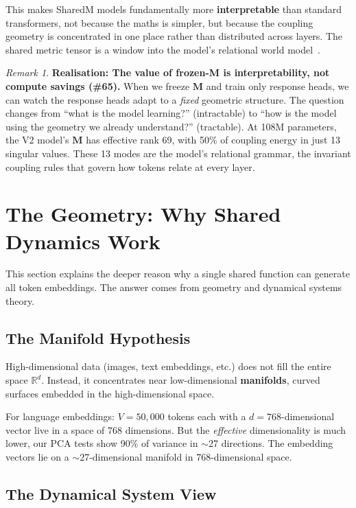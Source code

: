 \documentclass[11pt, a4paper]{article}
\newcommand{\M}{\mathbf{M}}
\newcommand{\R}{\mathbb{R}}
\theoremstyle{remark}
\newtheorem*{remark}{Remark}
\begin{document}
This makes SharedM models fundamentally more \textbf{interpretable} than standard transformers, not because the maths is simpler, but because the coupling geometry is concentrated in one place rather than distributed across layers.
The shared metric tensor is a window into the model's relational world model~\cite{brunton2022data}.

\begin{remark}
\textbf{Realisation: The value of frozen-M is interpretability, not compute savings (\#65).}
When we freeze $\M$ and train only response heads, we can watch the response heads adapt to a \emph{fixed} geometric structure.
The question changes from ``what is the model learning?'' (intractable) to ``how is the model using the geometry we already understand?'' (tractable).
At 108M parameters, the V2 model's $\M$ has effective rank 69, with 50\% of coupling energy in just 13 singular values.
These 13 modes are the model's relational grammar, the invariant coupling rules that govern how tokens relate at every layer.
\end{remark}

\section{The Geometry: Why Shared Dynamics Work}
\label{sec:geometry}

This section explains the deeper reason why a single shared function can generate all token embeddings.
The answer comes from geometry and dynamical systems theory.

\subsection{The Manifold Hypothesis}

High-dimensional data (images, text embeddings, etc.) does not fill the entire space $\R^d$.
Instead, it concentrates near low-dimensional \textbf{manifolds}, curved surfaces embedded in the high-dimensional space.

For language embeddings: $V = 50{,}000$ tokens each with a $d = 768$-dimensional vector live in a space of 768 dimensions.
But the \emph{effective} dimensionality is much lower, our PCA tests show 90\% of variance in $\sim$27 directions.
The embedding vectors lie on a $\sim$27-dimensional manifold in 768-dimensional space.

\subsection{The Dynamical System View}
\end{document}
